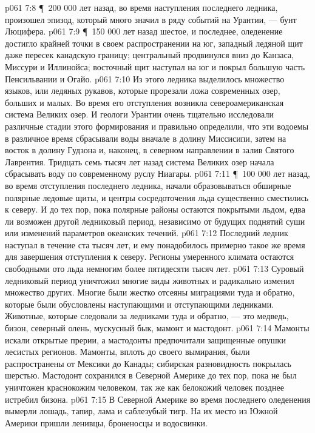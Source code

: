 \vs p061 7:8 \P\ 200 000 лет назад, во время наступления последнего ледника, произошел эпизод, который много значил в ряду событий на Урантии, --- бунт Люцифера.
\vs p061 7:9 \P\ 150 000 лет назад шестое, и последнее, оледенение достигло крайней точки в своем распространении на юг, западный ледяной щит даже пересек канадскую границу; центральный продвинулся вниз до Канзаса, Миссури и Иллинойса; восточный щит наступал на юг и покрыл большую часть Пенсильвании и Огайо.
\vs p061 7:10 Из этого ледника выделилось множество языков, или ледяных рукавов, которые прорезали ложа современных озер, больших и малых. Во время его отступления возникла североамериканская система Великих озер. И геологи Урантии очень тщательно исследовали различные стадии этого формирования и правильно определили, что эти водоемы в различное время сбрасывали воды вначале в долину Миссисипи, затем на восток в долину Гудзона и, наконец, в северном направлении в залив Святого Лаврентия. Тридцать семь тысяч лет назад система Великих озер начала сбрасывать воду по современному руслу Ниагары.
\vs p061 7:11 \P\ 100 000 лет назад, во время отступления последнего ледника, начали образовываться обширные полярные ледовые щиты, и центры сосредоточения льда существенно сместились к северу. И до тех пор, пока полярные районы остаются покрытыми льдом, едва ли возможен другой ледниковый период, независимо от будущих поднятий суши или изменений параметров океанских течений.
\vs p061 7:12 Последний ледник наступал в течение ста тысяч лет, и ему понадобилось примерно такое же время для завершения отступления к северу. Регионы умеренного климата остаются свободными ото льда немногим более пятидесяти тысяч лет.
\vs p061 7:13 Суровый ледниковый период уничтожил многие виды животных и радикально изменил множество других. Многие были жестко отсеяны миграциями туда и обратно, которые были обусловлены наступающими и отступающими ледниками. Животные, которые следовали за ледниками туда и обратно, --- это медведь, бизон, северный олень, мускусный бык, мамонт и мастодонт.
\vs p061 7:14 Мамонты искали открытые прерии, а мастодонты предпочитали защищенные опушки лесистых регионов. Мамонты, вплоть до своего вымирания, были распространены от Мексики до Канады; сибирская разновидность покрылась шерстью. Мастодонт сохранился в Северной Америке до тех пор, пока не был уничтожен краснокожим человеком, так же как белокожий человек позднее истребил бизона.
\vs p061 7:15 В Северной Америке во время последнего оледенения вымерли лошадь, тапир, лама и саблезубый тигр. На их место из Южной Америки пришли ленивцы, броненосцы и водосвинки.
